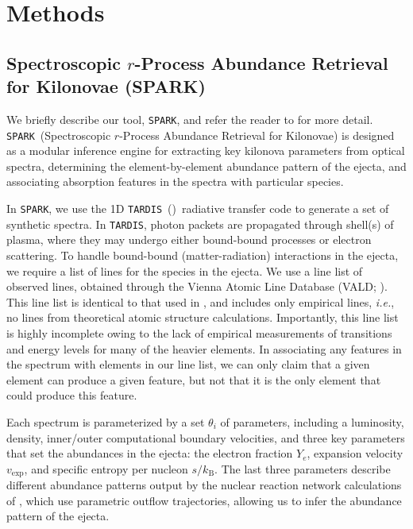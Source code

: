 \documentclass[twocolumn,twocolappendix]{aastex63}
\def\SPARK{\texttt{SPARK}}
\def\TARDIS{\texttt{TARDIS}}
\def\V23{\citetalias{vieira23}}
\def\ie{{\it i.e.}}
\begin{document}





\section{Methods}\label{sec:methods}

\subsection{Spectroscopic $r$-Process Abundance Retrieval for Kilonovae (\textsc{SPARK})}\label{ssc:spark-summary}

We briefly describe our tool, \SPARK, and refer the reader to \V23 for more detail. \SPARK~(Spectroscopic $r$-Process Abundance Retrieval for Kilonovae) is designed as a modular inference engine for extracting key kilonova parameters from optical spectra, determining the element-by-element abundance pattern of the ejecta, and associating absorption features in the spectra with particular species. 

In \SPARK, we use the 1D \TARDIS~(\citealt{kerzendorf14, kerzendorf23})~radiative transfer code to generate a set of synthetic spectra. In \TARDIS, photon packets are propagated through shell(s) of plasma, where they may undergo either bound-bound processes or electron scattering. To handle bound-bound (matter-radiation) interactions in the ejecta, we require a list of lines for the species in the ejecta. We use a line list of observed lines, obtained through the Vienna Atomic Line Database (VALD; \citealt{ryabchikova15, pakhomov19}). This line list is identical to that used in \V23, and includes only empirical lines, \ie, no lines from theoretical atomic structure calculations. Importantly, this line list is highly incomplete owing to the lack of empirical measurements of transitions and energy levels for many of the heavier elements. In associating any features in the spectrum with elements in our line list, we can only claim that a given element can produce a given feature, but not that it is the only element that could produce this feature. 

Each spectrum is parameterized by a set $\theta_i$ of parameters, including a luminosity, density, inner/outer computational boundary velocities, and three key parameters that set the abundances in the ejecta: the electron fraction $Y_e$, expansion velocity $v_{\mathrm{exp}}$, and specific entropy per nucleon $s / k_{\mathrm{B}}$. The last three parameters describe different abundance patterns output by the nuclear reaction network calculations of \cite{wanajo18}, which use parametric outflow trajectories, allowing us to infer the abundance pattern of the ejecta.  
\end{document}
